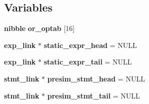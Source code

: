 \subsection*{Variables}
\begin{CompactItemize}
\item 
{\bf nibble} {\bf or\_\-optab} [16]
\item 
{\bf exp\_\-link} $\ast$ {\bf static\_\-expr\_\-head} = NULL
\item 
{\bf exp\_\-link} $\ast$ {\bf static\_\-expr\_\-tail} = NULL
\item 
{\bf stmt\_\-link} $\ast$ {\bf presim\_\-stmt\_\-head} = NULL
\item 
{\bf stmt\_\-link} $\ast$ {\bf presim\_\-stmt\_\-tail} = NULL
\end{CompactItemize}



